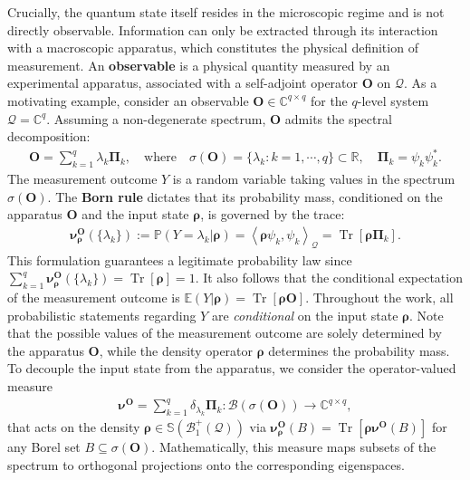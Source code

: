 \documentclass[noinfoline]{imsart}\setcounter{tocdepth}{2}
\renewcommand{\b}[1]{\mathbb{#1}} %
\newcommand{\m}[1]{\mathbf{#1}} %
\newcommand{\s}[1]{\mathscr{#1}} %
\renewcommand{\c}[1]{\mathcal{#1}} %
\newcommand{\mb}[1]{\boldsymbol{#1}} %
\newcommand{\tr}[1]{\operatorname{Tr}\left[#1\right]}
\newcommand{\innpr}[2]{{\left\langle {#1},{#2}\right\rangle}} %
\theoremstyle{plain}
\begin{document}
Crucially, the quantum state itself resides in the microscopic regime and is not directly observable. Information can only be extracted through its interaction with a macroscopic apparatus, which constitutes the physical definition of measurement. 
An \textbf{observable} is a physical quantity measured by an experimental apparatus, associated with a self-adjoint operator $\m{O}$ on $\c{Q}$.
As a motivating example, consider an observable $\m{O} \in \b{C}^{q \times q}$ for the $q$-level system $\c{Q} = \b{C}^{q}$. Assuming a non-degenerate spectrum, $\m{O}$ admits the spectral decomposition:
\begin{align*}
    \m{O} = \sum_{k=1}^{q} \lambda_{k} \mb{\Pi}_{k}, \quad \text{where} \quad \sigma(\m{O}) = \{\lambda_{k} : k =1, \cdots, q \} \subset \b{R}, \quad \mb{\Pi}_{k} = \psi_{k} \psi_{k}^{*}.
\end{align*}
The measurement outcome $Y$ is a random variable taking values in the spectrum $\sigma(\m{O})$. The \textbf{Born rule} dictates that its probability mass, conditioned on the apparatus $\m{O}$ and the input state $\mb{\rho}$, is governed by the trace:
\begin{align*}
    \mb{\nu}^{\m{O}}_{\mb{\rho}}(\{\lambda_{k}\}) := \b{P}(Y = \lambda_{k} \vert \mb{\rho}) = \innpr{\mb{\rho} \psi_{k}}{\psi_{k}}_{\c{Q}} = \tr{\mb{\rho} \mb{\Pi}_{k}}.
\end{align*}
This formulation guarantees a legitimate probability law since $\sum_{k=1}^{q} \mb{\nu}^{\m{O}}_{\mb{\rho}}(\{\lambda_{k}\}) = \tr{\mb{\rho}} = 1$. It also follows that the conditional expectation of the measurement outcome is $\b{E}(Y \vert \mb{\rho}) = \tr{\mb{\rho} \m{O}}$. Throughout the work, all probabilistic statements regarding $Y$ are \emph{conditional} on the input state $\mb{\rho}$.
Note that the possible values of the measurement outcome are solely determined by the apparatus $\m{O}$, while the density operator $\mb{\rho}$ determines the probability mass. To decouple the input state from the apparatus, we consider the operator-valued measure 
\begin{align*}
    \mb{\nu}^{\m{O}} = \sum_{k=1}^{q} \delta_{\lambda_{k}} \mb{\Pi}_{k} : \s{B}(\sigma(\m{O})) \to \b{C}^{q \times q},
\end{align*}
that acts on the density $\mb{\rho} \in \b{S}(\c{B}_{1}^{+}(\c{Q}))$ via $\mb{\nu}^{\m{O}}_{\mb{\rho}}(B) = \tr{\mb{\rho} \mb{\nu}^{\m{O}}(B)}$ for any Borel set $B \subseteq \sigma(\m{O})$. Mathematically, this measure maps subsets of the spectrum to orthogonal projections onto the corresponding eigenspaces.
\end{document}
